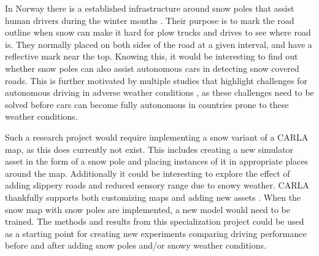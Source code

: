 


 In Norway there is a established infrastructure around snow poles that assist human drivers during the winter months \cite{statens-vegvesen-handbok-111}. Their purpose is to mark the road outline when snow can make it hard for plow trucks and drives to see where road is. They normally placed on both sides of the road at a given interval, and have a reflective mark near the top. Knowing this, it would be interesting to find out whether snow poles can also assist autonomous cars in detecting snow covered roads. This is further motivated by multiple studies that highlight challenges for autonomous driving in adverse weather conditions \cite{impact-of-adverse-weather-conditions, Sensor-Fusion-Based-Semantic-Segmentation}, as these challenges need to be solved before cars can become fully autonomous in countries prone to these weather conditions.

Such a research project would require implementing a snow variant of a CARLA map, as this does currently not exist. This includes creating a new simulator asset in the form of a snow pole and placing instances of it in appropriate places around the map. Additionally it could be interesting to explore the effect of adding slippery roads and reduced sensory range due to snowy weather. CARLA thankfully supports both customizing maps and adding new assets \cite{carla-custom-maps, carla-custom-props}. When the snow map with snow poles are implemented, a new model would need to be trained. The methods and results from this specialization project could be used as a starting point for creating new experiments comparing driving performance before and after adding snow poles and/or snowy weather conditions. %


